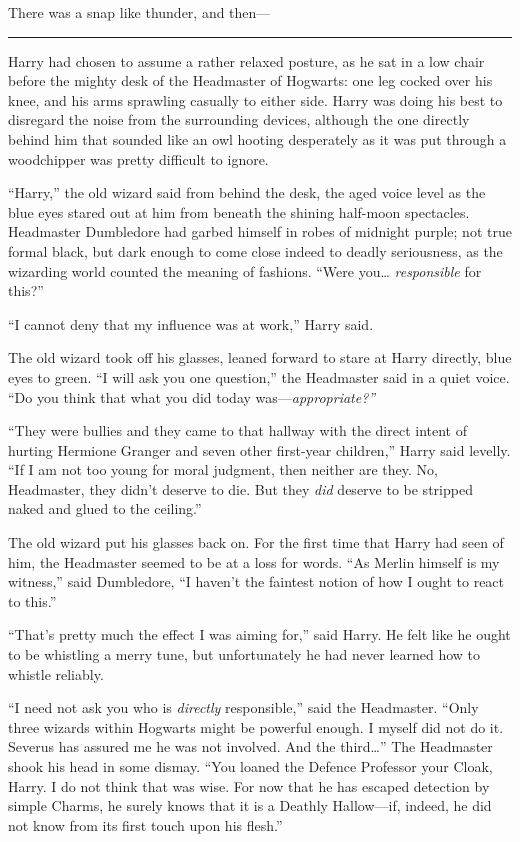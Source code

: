 There was a snap like thunder, and then---

\begin{center}\rule{3in}{0.4pt}\end{center}

Harry had chosen to assume a rather relaxed posture, as he sat in a low
chair before the mighty desk of the Headmaster of Hogwarts: one leg
cocked over his knee, and his arms sprawling casually to either side.
Harry was doing his best to disregard the noise from the surrounding
devices, although the one directly behind him that sounded like an owl
hooting desperately as it was put through a woodchipper was pretty
difficult to ignore.

``Harry,'' the old wizard said from behind the desk, the aged voice
level as the blue eyes stared out at him from beneath the shining
half-moon spectacles. Headmaster Dumbledore had garbed himself in robes
of midnight purple; not true formal black, but dark enough to come close
indeed to deadly seriousness, as the wizarding world counted the meaning
of fashions. ``Were you\ldots{} \emph{responsible} for this?''

``I cannot deny that my influence was at work,'' Harry said.

The old wizard took off his glasses, leaned forward to stare at Harry
directly, blue eyes to green. ``I will ask you one question,'' the
Headmaster said in a quiet voice. ``Do you think that what you did today
was---\emph{appropriate?''}

``They were bullies and they came to that hallway with the direct intent
of hurting Hermione Granger and seven other first-year children,'' Harry
said levelly. ``If I am not too young for moral judgment, then neither
are they. No, Headmaster, they didn't deserve to die. But they
\emph{did} deserve to be stripped naked and glued to the ceiling.''

The old wizard put his glasses back on. For the first time that Harry
had seen of him, the Headmaster seemed to be at a loss for words. ``As
Merlin himself is my witness,'' said Dumbledore, ``I haven't the
faintest notion of how I ought to react to this.''

``That's pretty much the effect I was aiming for,'' said Harry. He felt
like he ought to be whistling a merry tune, but unfortunately he had
never learned how to whistle reliably.

``I need not ask you who is \emph{directly} responsible,'' said the
Headmaster. ``Only three wizards within Hogwarts might be powerful
enough. I myself did not do it. Severus has assured me he was not
involved. And the third\ldots{}'' The Headmaster shook his head in some
dismay. ``You loaned the Defence Professor your Cloak, Harry. I do not
think that was wise. For now that he has escaped detection by simple
Charms, he surely knows that it is a Deathly Hallow---if, indeed, he did
not know from its first touch upon his flesh.''

